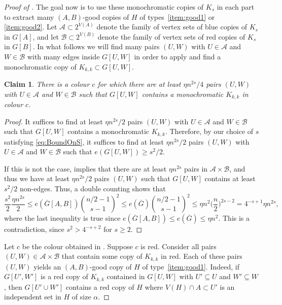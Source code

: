 \documentclass[a4paper,reqno,11pt]{amsart}
\newtheorem{claim}[theorem]{Claim}
\theoremstyle{definition}
\theoremstyle{remark}
\newcommand\cA{\mathcal{A}}
\newcommand\cB{\mathcal{B}}
\renewcommand\le{\leqslant}
\renewcommand\ge{\geqslant}
\def\cA{\mathcal{A}}
\begin{document}
\begin{proof}[Proof of ]
The goal now is to use these monochromatic copies of $K_s$ in each part to extract many $(A,B)$-good copies of $H$ of types~\ref{item:good1} or~
\ref{item:good2}. Let $\cA \subset 2^{V(A)}$ denote the family of vertex sets of blue copies of $K_s$ in $G[A]$, and let $\cB \subset 2^{V(B)}$ denote the family of vertex sets of red copies of $K_s$ in $G[B]$. In what follows we will find many pairs $(U,W)$ with $U \in \cA$ and $W \in \cB$ with many edges inside $G[U,W]$ in order to apply  and find a monochromatic copy of $K_{k,k} \subset G[U,W]$.

\begin{claim}\label{claim:UW}
There is a colour $c$ for which there are at least $\eta n^{2s}/4$ pairs $(U,W)$ with $U \in \cA$ and $W \in \cB$ such that $G[U,W]$ contains a monochromatic $K_{k,k}$ in colour $c$.  
\end{claim}

\begin{proof}
It suffices to find at least $\eta n^{2s}/2$ pairs $(U,W)$ with $U \in \cA$ and $W \in \cB$ such that $G[U,W]$ contains a monochromatic $K_{k,k}$. Therefore, by our choice of $s$ satisfying \eqref{eq:BoundOnS}, it suffices to find at least $\eta n^{2s}/2$ pairs $(U,W)$ with $U \in \cA$ and $W \in \cB$ such that $e(G[U,W]) \ge s^2/2$. 

If this is not the case,  implies that there are at least $\eta n^{2s}$ pairs in $\cA \times \cB$, and thus we have at least $\eta n^{2s}/2$ pairs $(U,W)$ such that $G[U,W]$ contains at least $s^{2}/2$ non-edges. Thus, a double counting shows that
\[\frac{s^2}{2}\frac{\eta n^{2s}}{2} \le e(\overline{G}[A,B])\binom{n/2-1}{s-1}^2 \le e(\overline{G})\binom{n/2-1}{s-1}^2\le \eta n^2\Big(\frac{n}{2}\Big)^{2s-2}=4^{-s+1}\eta n^{2s},\]
where the last inequality is true since $e(\overline{G}[A,B])\le e(\overline{G})\le \eta n^2$. This is a contradiction, since $s^2 > 4^{-s+2}$ for $s\ge 2$.
\end{proof}

Let $c$ be the colour obtained in . Suppose $c$ is red. Consider all pairs $(U,W) \in \cA \times \cB$ that contain some copy of $K_{k,k}$ in red. Each of these pairs $(U,W)$ yields an $(A,B)$-good copy of $H$ of type~\ref{item:good1}. Indeed, if $G[U',W']$ is a red copy of $K_{k,k}$ contained in $G[U,W]$ with $U'\subseteq U$ and $W'\subseteq W$, then $G[U'\cup W']$ contains a red copy of $H$ where $V(H)\cap A \subset U'$ is an independent set in $H$ of size $\alpha$.


\end{proof}
\end{document}

